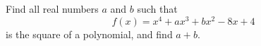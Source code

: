 Find all real numbers $a$ and $b$ such that
\[f(x)=x^4+ax^3+bx^2-8x+4\]
is the square of a polynomial, and find $a+b$.
